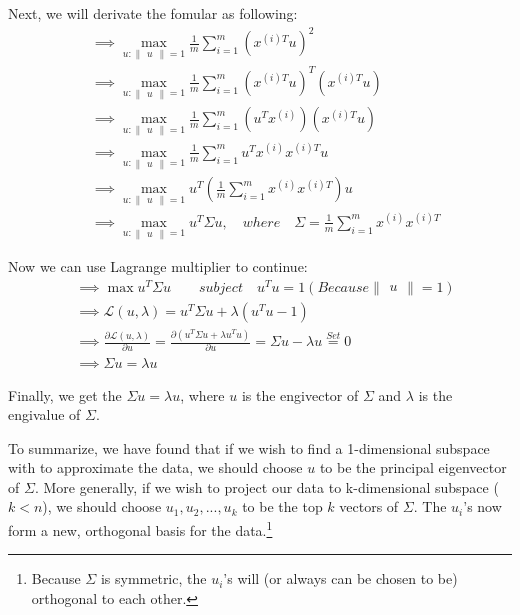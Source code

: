 \documentclass[a4paper]{article}
\begin{document}
Next, we will derivate the fomular as following:
\begin{align*}
	&\implies \max_{u:\begin{Vmatrix}u\end{Vmatrix}=1} \frac{1}{m} \sum_{i=1}^{m}(x^{(i)T}u)^{2} \\ 
	&\implies \max_{u:\begin{Vmatrix}u\end{Vmatrix}=1} \frac{1}{m} \sum_{i=1}^{m}(x^{(i)T}u)^{T}(x^{(i)T}u) \\
	&\implies \max_{u:\begin{Vmatrix}u\end{Vmatrix}=1} \frac{1}{m} \sum_{i=1}^{m}(u^Tx^{(i)})(x^{(i)T}u) \\
	&\implies \max_{u:\begin{Vmatrix}u\end{Vmatrix}=1} \frac{1}{m} \sum_{i=1}^{m}u^Tx^{(i)}x^{(i)T}u \\ 
	&\implies \max_{u:\begin{Vmatrix}u\end{Vmatrix}=1} u^T (\frac{1}{m}\sum_{i=1}^{m}x^{(i)}x^{(i)T})u \\
	&\implies \max_{u:\begin{Vmatrix}u\end{Vmatrix}=1} u^T \Sigma u, \quad where \quad \Sigma=\frac{1}{m}\sum_{i=1}^{m}x^{(i)}x^{(i)T}
\end{align*}

Now we can use Lagrange multiplier to continue: 
\begin{align*}
	&\implies \max u^T \Sigma u \quad \quad subject\quad u^Tu = 1(Because \begin{Vmatrix}u\end{Vmatrix}=1) \\
	&\implies \mathcal{L}(u,\lambda) = u^T \Sigma u + \lambda (u^Tu - 1) \\
	&\implies \frac{\partial \mathcal{L}(u,\lambda)}{\partial u} = \frac{\partial(u^T\Sigma u+\lambda u^Tu)}{\partial u}
    = \Sigma u - \lambda u \overset{Set}{=} 0 \\
	&\implies \Sigma u = \lambda u
\end{align*}

Finally, we get the $\Sigma u = \lambda u$, where $u$ is the engivector of $\Sigma$ and $\lambda$ is the engivalue of  $\Sigma$.

To summarize, we have found that if we wish to find a 1-dimensional subspace with to approximate the data, we should choose $u$ to be the principal eigenvector of $\Sigma$. More generally, if we wish to project our data to k-dimensional subspace ($k<n$), we should choose $u_1, u_2, ..., u_k$ to be the top $k$ vectors of $\Sigma$. The $u_i$'s now form a new, orthogonal basis for the data.\footnote{Because $\Sigma$ is symmetric, the $u_i$'s will (or always can be chosen to be) orthogonal to each other.}
\end{document}
